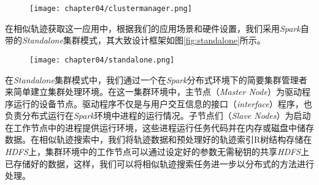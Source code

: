 \begin{figure}[!htp]
  \centering
  \texttt{[image: chapter04/clustermanager.png]}
\end{figure}

在相似轨迹获取这一应用中，根据我们的应用场景和硬件设置，我们采用\emph{Spark}自带的\emph{Standalone}集群模式，其大致设计框架如图\ref{fig:standalone}\cite{hongzhi2017parallel}所示。

\begin{figure}[!htp]
  \centering
  \texttt{[image: chapter04/standalone.png]}
\end{figure}

在\emph{Standalone}集群模式中，我们通过一个在\emph{Spark}分布式环境下的简要集群管理者来简单建立集群处理环境。在这一集群环境中，主节点（\emph{Master Node}）为驱动程序运行的设备节点。驱动程序不仅是与用户交互信息的接口（\emph{interface}）程序，也负责分布式运行在\emph{Spark}环境中进程的运行情况。子节点们（\emph{Slave Nodes}）为启动在工作节点中的进程提供运行环境，这些进程运行任务代码并在内存或磁盘中储存数据。在相似轨迹搜索中，我们将轨迹数据和预处理好的轨迹索引R树结构存储在\emph{HDFS}上，集群环境中的工作节点可以通过设定好的参数无需秘钥的共享\emph{HDFS}上已存储好的数据，这样，我们可以将相似轨迹搜索任务进一步以分布式的方法进行处理。


